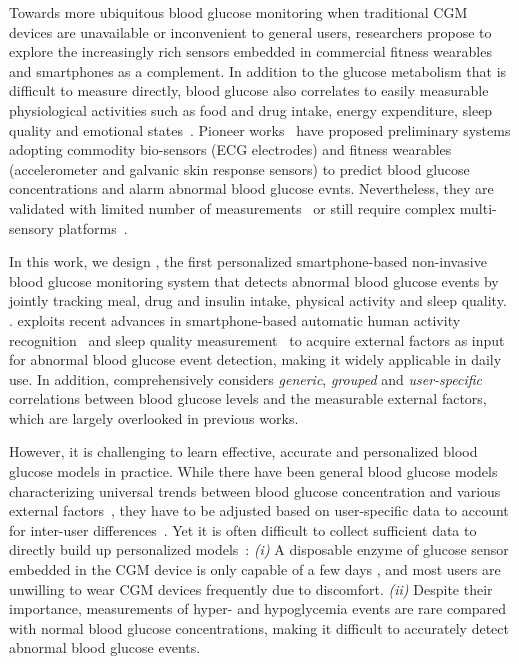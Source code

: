 Towards more ubiquitous blood glucose monitoring when traditional CGM devices are unavailable or inconvenient to general users, researchers propose to explore the increasingly rich sensors embedded in commercial fitness wearables and smartphones as a complement.
In addition to the glucose metabolism that is difficult to measure directly, blood glucose also correlates to easily measurable physiological activities such as food and drug intake, energy expenditure, sleep quality and emotional states~\cite{bib:DRCP15:Iwasaki}.
Pioneer works~\cite{bib:EMBC12:Nguyen, bib:SEMPER16:Ranvier, bib:JDST14:Sobel} have proposed preliminary systems adopting commodity bio-sensors (\eg ECG electrodes) and fitness wearables (\eg accelerometer and galvanic skin response sensors) to predict blood glucose concentrations and alarm abnormal blood glucose evnts.
Nevertheless, they are validated with limited number of measurements~\cite{bib:SEMPER16:Ranvier, bib:JDST14:Sobel} or still require complex multi-sensory platforms~\cite{bib:EMBC12:Nguyen, bib:JDST14:Sobel}.

In this work, we design \sysname, the first personalized smartphone-based non-invasive blood glucose monitoring system that detects abnormal blood glucose events by jointly tracking meal, drug and insulin intake, physical activity and sleep quality. 
.
\sysname exploits recent advances in smartphone-based automatic human activity recognition~\cite{bib:KDDEN11:Kwapisz} and sleep quality measurement~\cite{bib:UbiComp14:Gu} to acquire external factors as input for abnormal blood glucose event detection, making it widely applicable in daily use.
In addition, \sysname comprehensively considers \emph{generic}, \emph{grouped}  and \emph{user-specific} correlations between blood glucose levels and the measurable external factors, which are largely overlooked in previous works.

However, it is challenging to learn effective, accurate and personalized blood glucose models in practice.
While there have been general blood glucose models characterizing universal trends between blood glucose concentration and various external factors~\cite{bib:IJNMBE16:Oviedo}, they have to be adjusted based on user-specific data to account for inter-user differences~\cite{bib:ICMLA13:Bunescu}.
Yet it is often difficult to collect sufficient data to directly build up personalized models~\cite{bib:KDHealth16:Marling}:
\emph{(i)}
A disposable enzyme of glucose sensor embedded in the CGM device is only capable of a few days \cite{bib:CGM_wiki, bib:CGM_wave}, and most users are unwilling to wear CGM devices frequently due to discomfort.
\emph{(ii)}
Despite their importance, measurements of hyper- and hypoglycemia events are rare compared with normal blood glucose concentrations, making it difficult to accurately detect abnormal blood glucose events.

